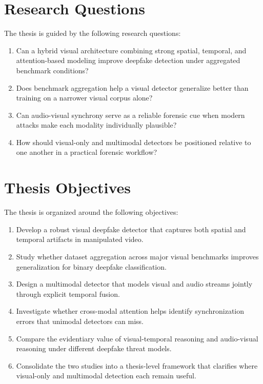 \section{Research Questions}

The thesis is guided by the following research questions:
\begin{enumerate}[label=RQ\arabic*.]
    \item Can a hybrid visual architecture combining strong spatial, temporal, and attention-based modeling improve deepfake detection under aggregated benchmark conditions?
    \item Does benchmark aggregation help a visual detector generalize better than training on a narrower visual corpus alone?
    \item Can audio-visual synchrony serve as a reliable forensic cue when modern attacks make each modality individually plausible?
    \item How should visual-only and multimodal detectors be positioned relative to one another in a practical forensic workflow?
\end{enumerate}

\section{Thesis Objectives}

The thesis is organized around the following objectives:
\begin{enumerate}[label=\arabic*.]
    \item Develop a robust visual deepfake detector that captures both spatial and temporal artifacts in manipulated video.
    \item Study whether dataset aggregation across major visual benchmarks improves generalization for binary deepfake classification.
    \item Design a multimodal detector that models visual and audio streams jointly through explicit temporal fusion.
    \item Investigate whether cross-modal attention helps identify synchronization errors that unimodal detectors can miss.
    \item Compare the evidentiary value of visual-temporal reasoning and audio-visual reasoning under different deepfake threat models.
    \item Consolidate the two studies into a thesis-level framework that clarifies where visual-only and multimodal detection each remain useful.
\end{enumerate}


